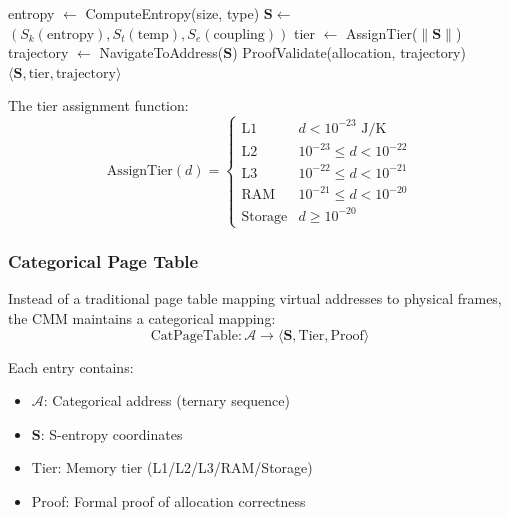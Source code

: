 \documentclass[twocolumn,10pt]{article}
\theoremstyle{definition}
\theoremstyle{remark}
\newcommand{\cataddr}{\mathcal{A}}
\newcommand{\Scoord}{\mathbf{S}}
\begin{document}
\begin{algorithm}
\caption{Categorical Memory Allocation}
\begin{algorithmic}[1]
    \State entropy $\gets$ ComputeEntropy(size, type)
    \State $\Scoord \gets$ $(S_k(\text{entropy}), S_t(\text{temp}), S_e(\text{coupling}))$
    \State tier $\gets$ AssignTier($\|\Scoord\|$)
    \State trajectory $\gets$ NavigateToAddress($\Scoord$)
    \State ProofValidate(allocation, trajectory)
    \State \Return $\langle \Scoord, \text{tier}, \text{trajectory} \rangle$
\EndFunction
\end{algorithmic}
\end{algorithm}

The tier assignment function:
\begin{equation}
    \text{AssignTier}(d) = \begin{cases}
        \text{L1} & d < 10^{-23} \text{ J/K} \\
        \text{L2} & 10^{-23} \leq d < 10^{-22} \\
        \text{L3} & 10^{-22} \leq d < 10^{-21} \\
        \text{RAM} & 10^{-21} \leq d < 10^{-20} \\
        \text{Storage} & d \geq 10^{-20}
    \end{cases}
\end{equation}

\subsubsection{Categorical Page Table}

Instead of a traditional page table mapping virtual addresses to physical frames, the CMM maintains a categorical mapping:
\begin{equation}
    \text{CatPageTable}: \cataddr \to \langle \Scoord, \text{Tier}, \text{Proof} \rangle
\end{equation}

Each entry contains:
\begin{itemize}
    \item $\cataddr$: Categorical address (ternary sequence)
    \item $\Scoord$: S-entropy coordinates
    \item Tier: Memory tier (L1/L2/L3/RAM/Storage)
    \item Proof: Formal proof of allocation correctness
\end{itemize}
\end{document}
